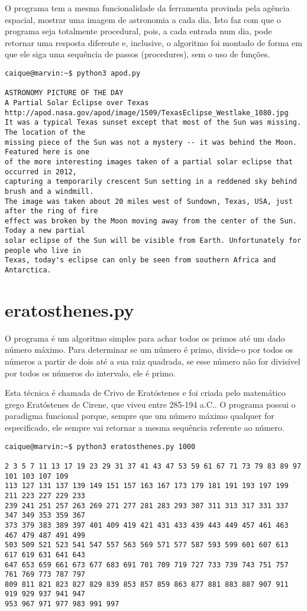 \documentclass{article}
\begin{document}
\sloppy
O programa tem a mesma funcionalidade da ferramenta provinda pela agência espacial, mostrar uma imagem de astronomia a cada dia. Isto faz com que o programa seja totalmente procedural, pois, a cada entrada num dia, pode retornar uma resposta diferente e, inclusive, o algoritmo foi montado de forma em que ele siga uma sequência de passos (procedures), sem o uso de funções.

\begin{verbatim}
caique@marvin:~$ python3 apod.py 

ASTRONOMY PICTURE OF THE DAY
A Partial Solar Eclipse over Texas
http://apod.nasa.gov/apod/image/1509/TexasEclipse_Westlake_1080.jpg
It was a typical Texas sunset except that most of the Sun was missing. The location of the
missing piece of the Sun was not a mystery -- it was behind the Moon. Featured here is one 
of the more interesting images taken of a partial solar eclipse that occurred in 2012, 
capturing a temporarily crescent Sun setting in a reddened sky behind brush and a windmill.
The image was taken about 20 miles west of Sundown, Texas, USA, just after the ring of fire 
effect was broken by the Moon moving away from the center of the Sun. Today a new partial 
solar eclipse of the Sun will be visible from Earth. Unfortunately for people who live in
Texas, today's eclipse can only be seen from southern Africa and Antarctica.
\end{verbatim}

\section*{eratosthenes.py}
O programa é um algoritmo simples para achar todos os primos até um dado número máximo. Para determinar se um número é primo, divide-o por todos os números a partir de dois até a sua raiz quadrada, se esse número não for divisível por todos os números do intervalo, ele é primo.

Esta técnica é chamada de Crivo de Eratóstenes e foi criada pelo matemático grego Eratóstenes de Cirene, que viveu entre 285-194 a.C.. O programa possui o paradigma funcional porque, sempre que um número máximo qualquer for especificado, ele sempre vai retornar a mesma sequência referente ao número.
\sloppy
\begin{verbatim}caique@marvin:~$ python3 eratosthenes.py 1000

2 3 5 7 11 13 17 19 23 29 31 37 41 43 47 53 59 61 67 71 73 79 83 89 97 101 103 107 109 
113 127 131 137 139 149 151 157 163 167 173 179 181 191 193 197 199 211 223 227 229 233 
239 241 251 257 263 269 271 277 281 283 293 307 311 313 317 331 337 347 349 353 359 367 
373 379 383 389 397 401 409 419 421 431 433 439 443 449 457 461 463 467 479 487 491 499
503 509 521 523 541 547 557 563 569 571 577 587 593 599 601 607 613 617 619 631 641 643
647 653 659 661 673 677 683 691 701 709 719 727 733 739 743 751 757 761 769 773 787 797
809 811 821 823 827 829 839 853 857 859 863 877 881 883 887 907 911 919 929 937 941 947 
953 967 971 977 983 991 997
\end{verbatim}
\end{document}
